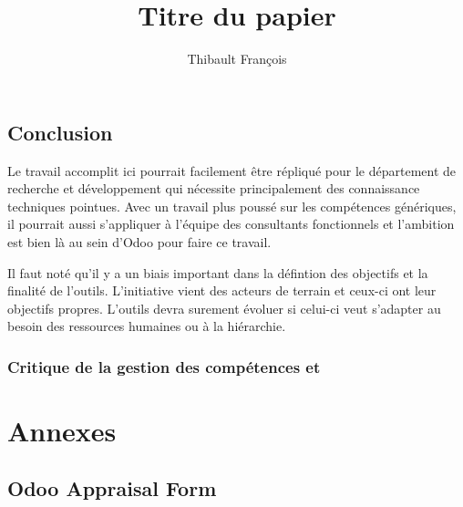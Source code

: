 \documentclass[a4paper,10pt]{report}
\begin{document}
\title  {Titre du papier}
\author  {Thibault François }
\maketitle

\tableofcontents  %

 
 


 

\chapter{Conclusion}
Le travail accomplit ici pourrait facilement être répliqué pour le département de recherche et développement qui nécessite principalement des connaissance techniques pointues. Avec un travail plus poussé sur les compétences génériques, il pourrait aussi s'appliquer à l'équipe des consultants fonctionnels et l'ambition est bien là au sein d'Odoo pour faire ce travail. 

Il faut noté qu'il y a un biais important dans la défintion des objectifs et la finalité de l'outils. L'initiative vient des acteurs de terrain et ceux-ci ont leur objectifs propres. L'outils devra surement évoluer si celui-ci veut s'adapter au besoin des ressources humaines ou à la hiérarchie. 
\section{Critique de la gestion des compétences et }







\label{Bibliographie}
\lhead{\nouppercase{\leftmark}}
 



\part*{Annexes}
\lhead{\nouppercase{\leftmark}}
\appendix %

\chapter{Odoo Appraisal Form}




\end{document}
